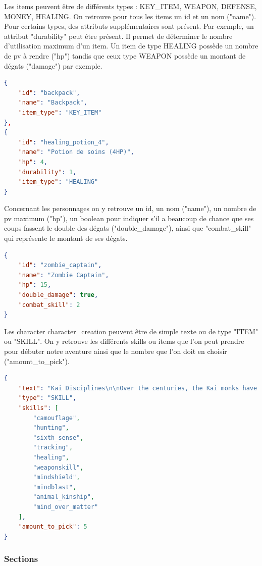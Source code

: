 			Les items peuvent être de différents types : KEY\_ITEM, WEAPON, DEFENSE, MONEY, HEALING. On retrouve pour tous les items un id et un nom ("name"). Pour certains types, des attributs supplémentaires sont présent. Par exemple, un attribut "durability" peut être présent. Il permet de déterminer le nombre d'utilisation maximum d'un item. Un item de type HEALING possède un nombre de pv à rendre ("hp") tandis que ceux type WEAPON possède un montant de dégats ("damage") par exemple.

\begin{lstlisting}[language=json, caption=Exemple d'items]
{
	"id": "backpack",
	"name": "Backpack",
	"item_type": "KEY_ITEM"
},
{
	"id": "healing_potion_4",
	"name": "Potion de soins (4HP)",
	"hp": 4,
	"durability": 1,
	"item_type": "HEALING"
}
\end{lstlisting}

			Concernant les personnages on y retrouve un id, un nom ("name"), un nombre de pv maximum ("hp"), un boolean pour indiquer s'il a beaucoup de chance que ses coups fassent le double des dégats ("double\_damage"), ainsi que "combat\_skill" qui représente le montant de ses dégats.

\begin{lstlisting}[language=json, caption=Exemple de personnage]
{
	"id": "zombie_captain",
	"name": "Zombie Captain",
	"hp": 15,
	"double_damage": true,
	"combat_skill": 2
}
\end{lstlisting}

			Les character character\_creation peuvent être de simple texte ou de type "ITEM" ou "SKILL". On y retrouve les différents skills ou items que l'on peut prendre pour débuter notre aventure ainsi que le nombre que l'on doit en choisir ("amount\_to\_pick").

\begin{lstlisting}[language=json, caption=Exemple de character\_creation]
{
	"text": "Kai Disciplines\n\nOver the centuries, the Kai monks have mastered the skills of the warrior. These skills are known as the Kai Disciplines, [...]",
	"type": "SKILL",
	"skills": [
		"camouflage",
		"hunting",
		"sixth_sense",
		"tracking",
		"healing",
		"weaponskill",
		"mindshield",
		"mindblast",
		"animal_kinship",
		"mind_over_matter"
	],
	"amount_to_pick": 5
}
\end{lstlisting}

		\subsubsection{Sections}

